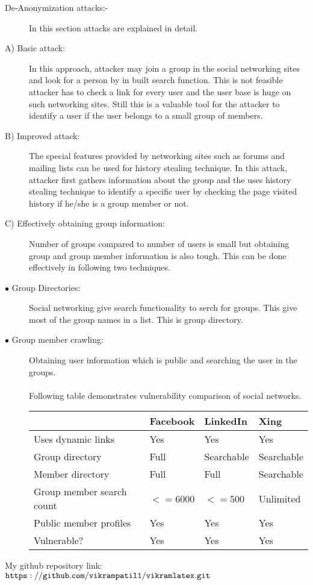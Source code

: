 \documentclass{article}
\begin{document}
\begin{description}
\item[De-Anonymization attacks:-]
\item[]In this section attacks are explained in detail.
\item[A)	Basic attack:]
\item[]In this approach, attacker may join a group in the social networking sites and look for a person by in built search function. This is not feasible attacker has to check a link for every user and the user base is huge on such networking sites. Still this is a valuable tool for the attacker to identify a user if the user belongs to a small group of members.
\item[B)	Improved attack:]
\item[]The special features provided by networking sites such as forums and mailing lists can be used for history stealing technique. In this attack, attacker first gathers information about the group and the uses history stealing technique to identify a specific user by checking the page visited history if he/she is a group member or not.
\item[C)	Effectively obtaining group information:]
\item[]Number of groups compared to number of users is small but obtaining group and group member information is also tough. This can be done effectively in following two techniques.
\item[$\bullet$ Group Directories:] Social networking give search functionality to serch for groups. This give most of the group names in a list. This is group directory.
\item[$\bullet$ Group member crawling:] Obtaining user information which is public and searching the user in the groups.\\\\
Following table demonstrates vulnerability comparison of social networks.


\begin{table}[ht]
\begin{tabular}{ |p{3cm}||p{2cm}| |p{2cm}||p{2cm}|}
\hline
 &Facebook&LinkedIn&Xing\\
\hline
Uses dynamic links	&Yes&Yes&Yes\\
\hline
Group directory&Full&Searchable&Searchable\\
\hline
Member directory&Full	&Full&Searchable\\
\hline
Group member search count&$<=$6000&$<=$500&	Unlimited\\
\hline
Public member profiles	&Yes&Yes&Yes\\
\hline
Vulnerable?&Yes&Yes&Yes\\
\hline
\end{tabular}
\end{table}
\end{description}
My github repository link: {$\tt https://github.com/vikrampatil1/vikramlatex.git$}	
\end{document}
